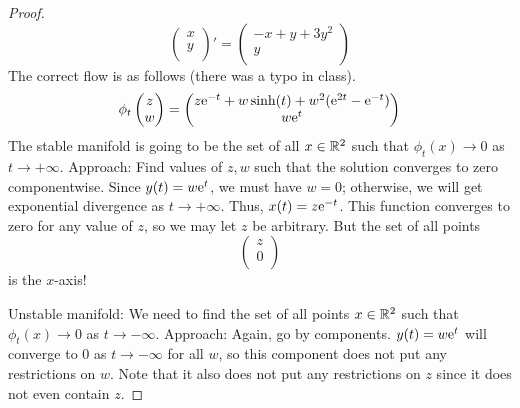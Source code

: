 \documentclass[../psets.tex]{subfiles}
\begin{document}
\begin{enumerate}
\begin{proof}
        \begin{equation*}
            \begin{pmatrix}
                x\\
                y\\
            \end{pmatrix}'
            =
            \begin{pmatrix}
                -x+y+3y^2\\
                y\\
            \end{pmatrix}
        \end{equation*}
        The correct flow is as follows (there was a typo in class).
        \begin{equation*}
            \phi_t
            \begin{pmatrix}
                z\\
                w\\
            \end{pmatrix}
            =
            \begin{pmatrix}
                z\e[-t]+w\sinh(t)+w^2(\e[2t]-\e[-t])\\
                w\e[t]\\
            \end{pmatrix}
        \end{equation*}
        The stable manifold is going to be the set of all $x\in\R^2$ such that $\phi_t(x)\to 0$ as $t\to +\infty$. Approach: Find values of $z,w$ such that the solution converges to zero componentwise.
        Since $y(t)=w\e[t]$, we must have $w=0$; otherwise, we will get exponential divergence as $t\to +\infty$.
        Thus, $x(t)=z\e[-t]$. This function converges to zero for any value of $z$, so we may let $z$ be arbitrary.
        But the set of all points
        \begin{equation*}
            \begin{pmatrix}
                z\\
                0\\
            \end{pmatrix}
        \end{equation*}
        is the $x$-axis!\par
        Unstable manifold: We need to find the set of all points $x\in\R^2$ such that $\phi_t(x)\to 0$ as $t\to -\infty$. Approach: Again, go by components.
        $y(t)=w\e[t]$ will converge to 0 as $t\to -\infty$ for all $w$, so this component does not put any restrictions on $w$. Note that it also does not put any restrictions on $z$ since it does not even contain $z$.

\end{proof}
\end{enumerate}
\end{document}
